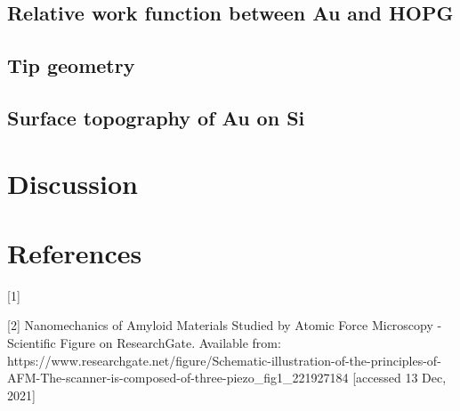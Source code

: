 \documentclass{article}
\begin{document}
\subsection{Relative work function between Au and HOPG}

\subsection{Tip geometry}

\subsection{Surface topography of Au on Si}

\section{Discussion}


\section*{References}

[1] 

[2] Nanomechanics of Amyloid Materials Studied by Atomic Force Microscopy - Scientific Figure on ResearchGate. Available from: https://www.researchgate.net/figure/Schematic-illustration-of-the-principles-of-AFM-The-scanner-is-composed-of-three-piezo_fig1_221927184 [accessed 13 Dec, 2021]
\end{document}
